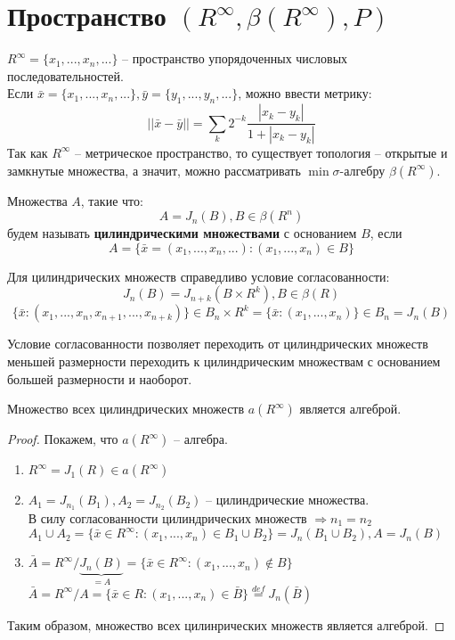 \section{Пространство $(R^\infty, \beta(R^\infty), P)$}
$R^\infty = \{x_1,...,x_n,...\}$ -- пространство упорядоченных числовых последовательностей.\\
Если $\bar{x}=\{x_1,...,x_n,...\}, \bar{y}=\{y_1,...,y_n,...\}$, можно ввести метрику:\\
$$||\bar{x}-\bar{y}||=\sum\limits_k 2^{-k} \frac{|x_k - y_k|}{1+|x_k - y_k|}$$
Так как $R^\infty$ -- метрическое пространство, то существует топология -- открытые и замкнутые множества, а значит, можно рассматривать $\min \sigma$-алгебру $\beta(R^\infty)$.
\begin{definition}
Множества $A$, такие что:
$$A=J_n (B), B \in \beta(R^n)$$
будем называть \textbf{цилиндрическими множествами} с основанием $B$, если $$A=\{\bar{x}=(x_1,...,x_n,...):(x_1,...,x_n)\in B\}$$
\end{definition}
Для цилиндрических множеств справедливо условие согласованности:
\begin{equation}
J_n (B)=J_{n+k} (B\times R^k), B\in \beta (R)
\end{equation}
$$\{\bar{x}:(x_1,...,x_n,x_{n+1},...,x_{n+k})\}\in B_n \times R^k=\{\bar{x}:(x_1,...,x_n)\}\in B_n=J_n (B)$$
\begin{remark}
Условие согласованности позволяет переходить от цилиндрических множеств меньшей размерности переходить к цилиндрическим множествам с основанием большей размерности и наоборот.
\end{remark}
\begin{proposition}
Множество всех цилиндрических множеств $a(R^\infty)$ является алгеброй.
\end{proposition}
\begin{proof}
Покажем, что $a(R^\infty)$ -- алгебра.
\begin{enumerate}
\item $R^\infty = J_1 (R) \in a(R^\infty)$
\item $A_1=J_{n_1}(B_1), A_2=J_{n_2}(B_2)$ -- цилиндрические множества.\\
В силу согласованности цилиндрических множеств $\Rightarrow n_1 = n_2$\\
$A_1\cup A_2 = \{\bar{x}\in R^\infty: (x_1,...,x_n)\in B_1\cup B_2\}=J_n (B_1\cup B_2), A=J_n(B)$
\item $\bar{A}=R^\infty/\underbrace{J_n(B)}_{=A}=\{\bar{x}\in R^\infty:(x_1,...,x_n)\notin B\}$\\
$\bar{A}=R^\infty/A = \{\bar{x}\in R:(x_1,...,x_n)\in \bar{B}\}\stackrel{def}{=}J_n(\bar{B})$
\end{enumerate}
Таким образом, множество всех цилинрических множеств является алгеброй.
\end{proof}
